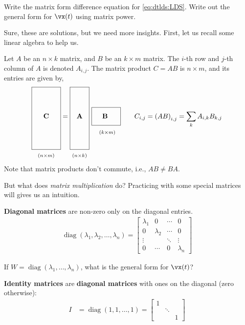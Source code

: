 \documentclass[a4paper,11pt]{exam}
\newcommand*{\clapp}[1]{\hbox to 0pt{\hss#1\hss}}
\newcommand*{\mat}[1]{\boldsymbol{\mathrm{#1}}}
\newcommand*{\subdims}[3]{\clapp{\raisebox{#1}[0pt][0pt]{$\scriptstyle(#2 \times #3)$}}}
\newcounter{ct}
\DeclareMathOperator*{\diag}{diag}
\begin{document}
\begin{questions}
\question Write the matrix form difference equation for \eqref{eq:dtlds:LDS}.
\question Write out the general form for $\vx(t)$ using matrix power.

Sure, these are solutions, but we need more insights.
First, let us recall some linear algebra to help us.
\begin{tcolorbox}[colback=black!1!,title=Matrix multiplication]
Let $A$ be an $n \times k$ matrix, and $B$ be an $k \times m$ matrix.
The $i$-th row and $j$-th column of $A$ is denoted $A_{i,j}$.
The matrix product $C = AB$ is $n \times m$, and its entries are given by,
\begin{align}
    \framebox[1.5cm]{\clapp{\raisebox{0pt}[1.5cm][1.5cm]{$\mat C$}}\subdims{-2.0cm} n m} =
    \framebox[1.0cm]{\clapp{\raisebox{0pt}[1.5cm][1.5cm]{$\mat A$}}\subdims{-2.0cm} n k} \ 
    \framebox[1.5cm]{\clapp{\raisebox{0mm}[4.5mm][2.5mm]{$\mat B$}}       \subdims{-8mm} k m}
    \qquad
    C_{i,j} = \left(
    A
    B
    \right)_{i,j}
    =
    \sum_k A_{i,k} B_{k,j}
    \label{eq:matmult}
\end{align}
\\[3mm]
\noindent
Note that matrix products don't commute, i.e., $AB \neq BA$.
\end{tcolorbox}
\newpage
But what does \emph{matrix multiplication} do?
Practicing with some special matrices will gives us an intuition.

\textbf{Diagonal matrices} are non-zero only on the diagonal entries.
\begin{align}\label{eq:LA:diag}
    \diag(\lambda_1, \lambda_2, \ldots, \lambda_n)
    =
    \begin{bmatrix}
	\lambda_1 & 0 & \cdots & 0 \\
	0 & \lambda_2 & \cdots & 0 \\
	\vdots & & \ddots & \vdots \\
	0 & \cdots & 0 & \lambda_n
    \end{bmatrix}
\end{align}

\question If $W = \diag(\lambda_1, \ldots, \lambda_n)$, what is the general form for $\vx(t)$?
\vspace{\stretch{0.3}}

\textbf{Identity matrices} are \textbf{diagonal matrices} with ones on the diagonal (zero otherwise):
\begin{align}\label{eq:LA:diag}
    I &=
	\diag(1, 1, \ldots, 1)
    =
    \begin{bmatrix}
	1 & & \\
	& \ddots & \\
	& & 1
    \end{bmatrix}
\end{align}


\end{questions}
\end{document}
